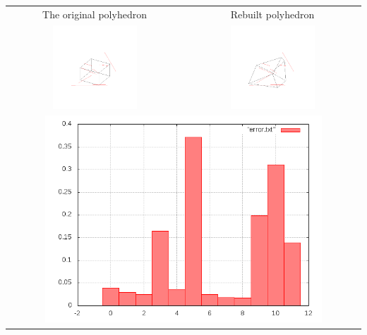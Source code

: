 \documentclass[11pt,fleqn,a4paper]{scrartcl}
\begin{document}
\begin{center}

\begin{tabular}{|c|c|}
\hline
The original polyhedron& Rebuilt polyhedron \\
\includegraphics[width=0.5\textwidth]{variant2/images/13/input.png} &
\includegraphics[width=0.5\textwidth]{variant2/images/13/out.png} \\
\midrule
\multicolumn{2}{|c|}{ \includegraphics[width=0.8\textwidth]{variant2/images/13/error.png}} \\
\hline
\end{tabular}
\end{center}
\end{document}
